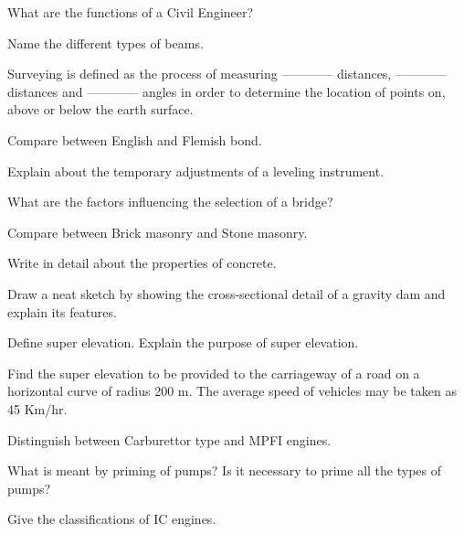 \newpage

\sub{\subj}
\maxtime

\sectionall

\sectionA

\partA

\iitem What are the functions of a Civil Engineer? 
\item Name the different types of beams. 

\item Surveying is defined as the process of measuring ------------ distances, ------------ distances and
  ------------ angles in order to determine the location of points on, above or below the earth surface.

 \marka

\partBt

\item Compare between English and Flemish bond.  
\item Explain about the temporary adjustments of a leveling instrument. 
\item What are the factors influencing the selection of a bridge? 

\partCo

\item \iitem Compare between Brick masonry and Stone masonry.
\Or 
\item Write in detail about the properties of concrete.
\ene

\item \iitem Draw a neat sketch by showing the cross-sectional detail of a gravity dam and explain its
  features.
\Or 
\item \iitem Define super elevation. Explain the purpose of super elevation.  
\item Find the super elevation to be provided to the carriageway of a road on a horizontal curve
  of radius 200 m. The average speed of vehicles may be taken as 45 Km/hr.

\ene
\ene
\ene

\newpage \again

\sectionB

\partA

\iitem Distinguish between Carburettor type and MPFI engines.  
\item What is meant by priming of pumps? Is it necessary to prime all the types of pumps?  
\item Give the classifications of IC engines. \marka


